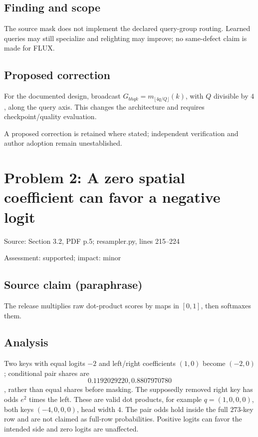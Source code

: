 \documentclass[11pt]{article}
\begin{document}
\subsection*{Finding and scope}

The source mask does not implement the declared query-group routing. Learned queries may still specialize and relighting may improve; no same-defect claim is made for FLUX.

\subsection*{Proposed correction}

For the documented design, broadcast \(G_{bhqk}=m_{\lfloor4q/Q\rfloor}(k)\), with \(Q\) divisible by \(4\), along the query axis. This changes the architecture and requires checkpoint/quality evaluation.

A proposed correction is retained where stated; independent verification and author adoption remain unestablished.

\section*{Problem 2: A zero spatial coefficient can favor a negative logit}

Source: Section 3.2, PDF p.5; resampler.py, lines 215–224

Assessment: supported; impact: minor

\subsection*{Source claim (paraphrase)}

The release multiplies raw dot-product scores by maps in \([0,1]\), then softmaxes them.

\subsection*{Analysis}

Two keys with equal logits \(-2\) and left/right coefficients \((1,0)\) become \((-2,0)\); conditional pair shares are \[0.1192029220,0.8807970780\], rather than equal shares before masking. The supposedly removed right key has odds \(e^2\) times the left. These are valid dot products, for example \(q=(1,0,0,0)\), both keys \((-4,0,0,0)\), head width \(4\). The pair odds hold inside the full \(273\)-key row and are not claimed as full-row probabilities. Positive logits can favor the intended side and zero logits are unaffected.
\end{document}
